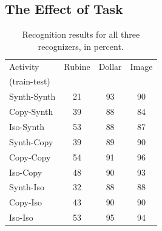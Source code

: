 \documentclass{egpubl}
\begin{document}
\subsection{The Effect of Task}
\begin{table}
\begin{tabular}{|l||c|c|c|}
\hline
Activity & Rubine & Dollar & Image \\
(train-test) &  & & \\
\hline
Synth-Synth & 21 & 93 & 90\\
Copy-Synth & 39 & 88 & 84\\
Iso-Synth & 53 & 88 & 87\\
Synth-Copy & 39 & 89 & 90\\
Copy-Copy & 54 & 91 & 96\\
Iso-Copy & 48 & 90 & 93\\
Synth-Iso & 32 & 88 & 88\\
Copy-Iso & 43 & 90 & 90\\
Iso-Iso & 53 & 95 & 94\\
\hline
\end{tabular}
\caption{Recognition results for all three recognizers, in percent.}
\label{tab:allResults}
\end{table}
\end{document}

